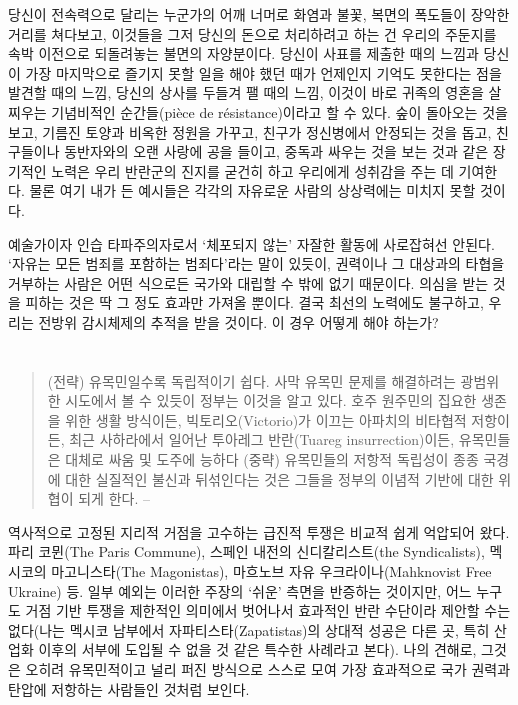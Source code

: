 \documentclass[10pt, b6paper, openany]{memoir}
\begin{document}
\begin{article}
당신이 전속력으로 달리는 누군가의 어깨 너머로 화염과 불꽃, 복면의 폭도들이 장악한 거리를 쳐다보고, 이것들을 그저 당신의 돈으로 처리하려고 하는 건 우리의 주둔지를 속박 이전으로 되돌려놓는 불면의 자양분이다. 당신이 사표를 제출한 때의 느낌과 당신이 가장 마지막으로 즐기지 못할 일을 해야 했던 때가 언제인지 기억도 못한다는 점을 발견할 때의 느낌, 당신의 상사를 두들겨 팰 때의 느낌, 이것이 바로 귀족의 영혼을 살찌우는 기념비적인 순간들(pièce de résistance)이라고 할 수 있다. 숲이 돌아오는 것을 보고, 기름진 토양과 비옥한 정원을 가꾸고, 친구가 정신병에서 안정되는 것을 돕고, 친구들이나 동반자와의 오랜 사랑에 공을 들이고, 중독과 싸우는 것을 보는 것과 같은 장기적인 노력은 우리 반란군의 진지를 굳건히 하고 우리에게 성취감을 주는 데 기여한다. 물론 여기 내가 든 예시들은 각각의 자유로운 사람의 상상력에는 미치지 못할 것이다.

예술가이자 인습 타파주의자로서  `체포되지 않는' 자잘한 활동에 사로잡혀선 안된다. `자유는 모든 범죄를 포함하는 범죄다'라는 말이 있듯이, 권력이나 그 대상과의 타협을 거부하는 사람은 어떤 식으로든 국가와 대립할 수 밖에 없기 때문이다. 의심을 받는 것을 피하는 것은 딱 그 정도 효과만 가져올 뿐이다. 결국 최선의 노력에도 불구하고, 우리는 전방위 감시체제의 추적을 받을 것이다. 이 경우 어떻게 해야 하는가? 

\section{}

\begin{quote}
(전략) 유목민일수록 독립적이기 쉽다. 사막 유목민 문제를 해결하려는 광범위한 시도에서 볼 수 있듯이 정부는 이것을 알고 있다. 호주 원주민의 집요한 생존을 위한 생활 방식이든, 빅토리오(Victorio)가 이끄는 아파치의 비타협적 저항이든, 최근 사하라에서 일어난 투아레그 반란(Tuareg insurrection)이든, 유목민들은 대체로 싸움 및 도주에 능하다 (중략) 유목민들의 저항적 독립성이 종종 국경에 대한 실질적인 불신과 뒤섞인다는 것은 그들을 정부의 이념적 기반에 대한 위협이 되게 한다. -- 
\end{quote}

역사적으로 고정된 지리적 거점을 고수하는 급진적 투쟁은 비교적 쉽게 억압되어 왔다. 파리 코뮌(The Paris Commune), 스페인 내전의 신디칼리스트(the Syndicalists), 멕시코의 마고니스타(The Magonistas), 마흐노브 자유 우크라이나(Mahknovist Free Ukraine) 등. 일부 예외는 이러한 주장의 `쉬운' 측면을 반증하는 것이지만, 어느 누구도 거점 기반 투쟁을 제한적인 의미에서 벗어나서 효과적인 반란 수단이라 제안할 수는 없다(나는 멕시코 남부에서 자파티스타(Zapatistas)의 상대적 성공은 다른 곳, 특히 산업화 이후의 서부에 도입될 수 없을 것 같은 특수한 사례라고 본다). 나의 견해로, 그것은 오히려 유목민적이고 널리 퍼진 방식으로 스스로 모여 가장 효과적으로 국가 권력과 탄압에 저항하는 사람들인 것처럼 보인다.


\end{article}
\end{document}
